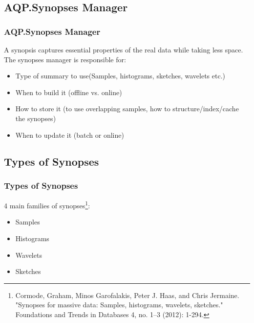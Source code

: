\documentclass{beamer}
\begin{document}
\subsection{AQP.Synopses Manager}
\begin{frame}
\frametitle{AQP.Synopses Manager}
A synopsis captures essential properties of the real data while taking less space.
\vspace{0.3 cm}
The synopses manager is responsible for:
\begin{itemize}
\item{Type of summary to use(Samples, histograms, sketches, wavelets etc.)}
\item{When to build it (offline vs. online)}
\item{How to store it (to use overlapping samples, how to structure/index/cache the synopses)}
\item{When to update it (batch or online)}
\end{itemize}
\end{frame}

\subsection{Types of Synopses}
\begin{frame}
\frametitle{Types of Synopses}
4 main families of synopses\footnote{\tiny Cormode, Graham, Minos Garofalakis, Peter J. Haas, and Chris Jermaine. "Synopses for massive data:
Samples, histograms, wavelets, sketches." Foundations and Trends in Databases 4, no. 1–3 (2012): 1-294.}:
\begin{itemize}
\vspace{0.3 cm}
\item{Samples}
\item{Histograms}
\item{Wavelets}
\item{Sketches}
\end{itemize}
\end{frame}
\end{document}
